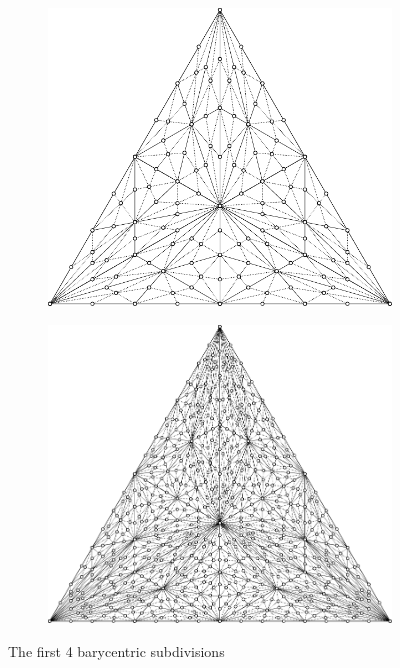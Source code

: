 \begin{figure}[H]
\begin{subfigure}{.45\linewidth}
  \end{subfigure}\\[2cm]
  \begin{subfigure}{.45\linewidth}
    \includegraphics[width=\linewidth]{figures/barycentric-3.pdf}
  \end{subfigure}
  \hspace{1cm}
  \begin{subfigure}{.45\linewidth}
    \includegraphics[width=\linewidth]{figures/barycentric-4.pdf}
  \end{subfigure}
  \caption{The first 4 barycentric subdivisions}
  \label{fig:subdivs}
\end{figure}
